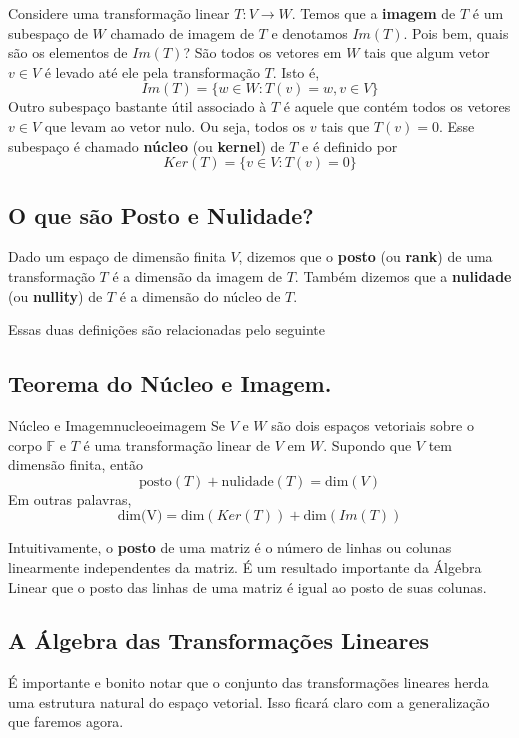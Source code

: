 \documentclass[12pt,a4paper]{article}
\begin{document}
Considere uma transformação linear $T:V\to W$. Temos que a \textbf{imagem} de $T$ é um subespaço de $W$ chamado de imagem de $T$ e denotamos $Im(T)$. Pois bem, quais são os elementos de $Im(T)$? São todos os vetores em $W$ tais que algum vetor $v \in V$ é levado até ele pela transformação $T$. Isto é,
$$
Im(T) = \{ w \in W : T(v) = w, v \in V \}
$$
Outro subespaço bastante útil associado à $T$ é aquele que contém todos os vetores $v \in V$ que levam ao vetor nulo. Ou seja, todos os $v$ tais que $T(v) = 0$. Esse subespaço é chamado \textbf{núcleo} (ou \textbf{kernel}) de $T$ e é definido por
$$
Ker(T) = \{ v \in V : T(v) = 0 \}
$$

\subsection{O que são Posto e Nulidade?}

Dado um espaço de dimensão finita $V$, dizemos que o \textbf{posto} (ou \textbf{rank}) de uma transformação $T$ é a dimensão da imagem de $T$. Também dizemos que a \textbf{nulidade} (ou \textbf{nullity}) de $T$ é a dimensão do núcleo de $T$.

Essas duas definições são relacionadas pelo seguinte

\subsection{Teorema do Núcleo e Imagem.}

\begin{teorema}{Núcleo e Imagem}{nucleoeimagem}
Se $V$ e $W$ são dois espaços vetoriais sobre o corpo $\mathbb{F}$ e $T$ é uma transformação linear de $V$ em $W$. Supondo que $V$ tem dimensão finita, então
$$
\text{posto}(T) + \text{nulidade}(T) = \text{dim}(V)
$$
Em outras palavras,
$$
\text{dim(V)} = \text{dim}(Ker(T)) + \text{dim}(Im(T))
$$
\end{teorema}

Intuitivamente, o \textbf{posto} de uma matriz é o número de linhas ou colunas linearmente independentes da matriz. É um resultado importante da Álgebra Linear que o posto das linhas de uma matriz é igual ao posto de suas colunas.

\subsection{A Álgebra das Transformações Lineares}

É importante e bonito notar que o conjunto das transformações lineares herda uma estrutura natural do espaço vetorial. Isso ficará claro com a generalização que faremos agora.
\end{document}
